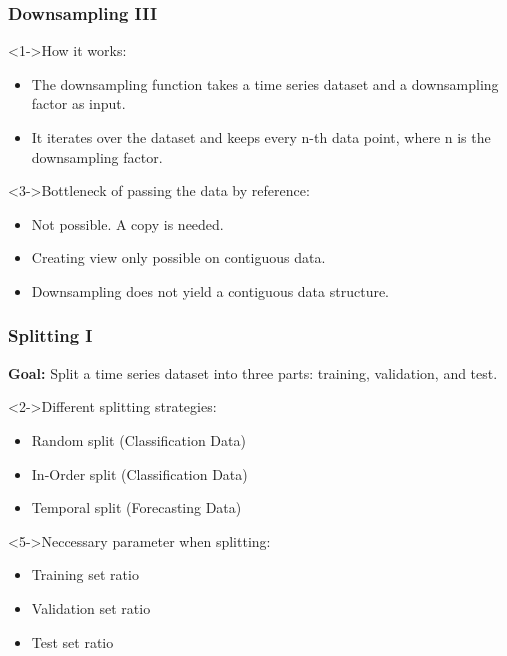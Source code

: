 \documentclass[t,english]{beamer}
\begin{document}
\begin{frame}
  \frametitle{Downsampling III}
  \begin{block}<1->{How it works:}
    \begin{itemize}
      \item<1-> The downsampling function takes a time series dataset and a downsampling factor as input.
      \item<2-> It iterates over the dataset and keeps every n-th data point, where n is the downsampling factor.
    \end{itemize}
  \end{block}

  \begin{block}<3->{Bottleneck of passing the data by reference:}
    \begin{itemize}
      \item<3-> Not possible. A copy is needed.
      \item <4-> Creating view only possible on contiguous data.
      \item <5-> Downsampling does not yield a contiguous data structure.
    \end{itemize}
  \end{block}
\end{frame}

\begin{frame}
  \frametitle{Splitting I}
  \textbf{Goal:} Split a time series dataset into three parts: training, validation, and test.

  \begin{block}<2->{Different splitting strategies:}
    \begin{itemize}
      \item<2-> Random split (Classification Data)
      \item<3-> In-Order split (Classification Data)
      \item<4-> Temporal split (Forecasting Data)
    \end{itemize}
  \end{block}

  \begin{block}<5->{Neccessary parameter when splitting:}
    \begin{itemize}
      \item<5-> Training set ratio
      \item<6-> Validation set ratio
      \item<7-> Test set ratio
    \end{itemize}
  \end{block}
\end{frame}
\end{document}
